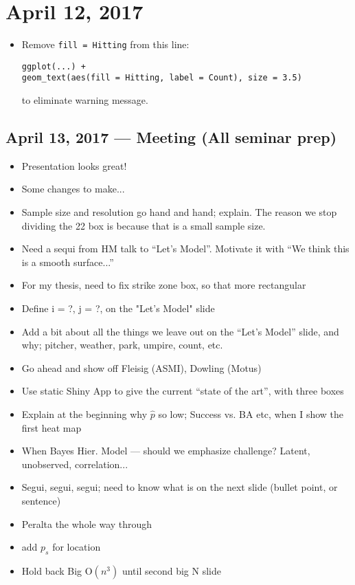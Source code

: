 \documentclass{article}
\begin{document}
\section*{April 12, 2017}
\begin{itemize}
\item Remove \verb|fill = Hitting| from this line:
\begin{verbatim}
ggplot(...) +
geom_text(aes(fill = Hitting, label = Count), size = 3.5)
\end{verbatim}
to eliminate warning message.
\end{itemize}

\subsection*{April 13, 2017 --- Meeting (All seminar prep)}
\begin{itemize}
\item Presentation looks great! 
\item Some changes to make...
\item Sample size and resolution go hand and hand; explain. The reason we stop dividing the 22 box is because that is a small sample size.
\item Need a sequi from HM talk to ``Let's Model''. Motivate it with ``We think this is a smooth surface...''
\item For my thesis, need to fix strike zone box, so that more rectangular
\item Define i = ?, j = ?, on the "Let's Model" slide
\item Add a bit about all the things we leave out on the ``Let's Model'' slide, and why; pitcher, weather, park, umpire, count, etc.
\item Go ahead and show off Fleisig (ASMI), Dowling (Motus)
\item Use static Shiny App to give the current ``state of the art'', with three boxes
\item Explain at the beginning why $\hat{p}$ so low; Success vs. BA etc, when I show the first heat map
\item When Bayes Hier. Model --- should we emphasize challenge? Latent, unobserved, correlation...
\item Segui, segui, segui; need to know what is on the next slide (bullet point, or sentence)
\item Peralta the whole way through
\item add $p_{s}$ for location
\item Hold back Big O$(n^{3})$ until second big N slide

\end{itemize}
\end{document}
